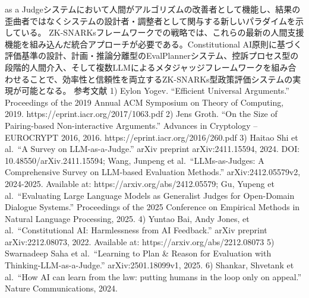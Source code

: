 as a
Judgeシステムにおいて人間がアルゴリズムの改善者として機能し、結果の歪曲者ではなくシステムの設計者・調整者として関与する新しいパラダイムを示している。
ZK-SNARKsフレームワークでの戦略では、これらの最新の人間支援機能を組み込んだ統合アプローチが必要である。Constitutional
AI原則に基づく評価基準の設計、計画・推論分離型のEvalPlannerシステム、控訴プロセス型の段階的人間介入、そして複数LLMによるメタジャッジフレームワークを組み合わせることで、効率性と信頼性を両立するZK-SNARKs型政策評価システムの実現が可能となる。
参考文献 1) Eylon Yogev. ``Efficient Universal Arguments.'' Proceedings
of the 2019 Annual ACM Symposium on Theory of Computing, 2019.
https://eprint.iacr.org/2017/1063.pdf 2) Jens Groth. ``On the Size of
Pairing-based Non-interactive Arguments.'' Advances in Cryptology --
EUROCRYPT 2016, 2016. https://eprint.iacr.org/2016/260.pdf 3) Haitao Shi
et al.~``A Survey on LLM-as-a-Judge.'' arXiv preprint arXiv:2411.15594,
2024. DOI: 10.48550/arXiv.2411.15594; Wang, Junpeng et
al.~``LLMs-as-Judges: A Comprehensive Survey on LLM-based Evaluation
Methods.'' arXiv:2412.05579v2, 2024-2025. Available at:
https://arxiv.org/abs/2412.05579; Gu, Yupeng et al.~``Evaluating Large
Language Models as Generalist Judges for Open-Domain Dialogue Systems.''
Proceedings of the 2025 Conference on Empirical Methods in Natural
Language Processing, 2025. 4) Yuntao Bai, Andy Jones, et
al.~``Constitutional AI: Harmlessness from AI Feedback.'' arXiv preprint
arXiv:2212.08073, 2022. Available at: https://arxiv.org/abs/2212.08073
5) Swarnadeep Saha et al.~``Learning to Plan \& Reason for Evaluation
with Thinking-LLM-as-a-Judge.'' arXiv:2501.18099v1, 2025. 6) Shankar,
Shvetank et al.~``How AI can learn from the law: putting humans in the
loop only on appeal.'' Nature Communications, 2024.


\printbibliography[heading=subbibliography,title={章末参考文献}]
